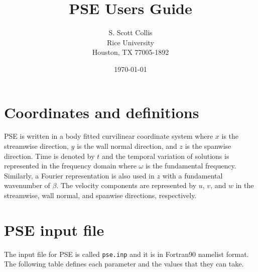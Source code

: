 \documentclass[10pt]{article}
\newcommand{\pse}{\textsf{PSE}\xspace}
\begin{document}
\title{\pse Users Guide}
\author{S. Scott Collis \\
Rice University \\
Houston, TX 77005-1892 }
\date{\today}
\maketitle

\section*{Coordinates and definitions}

\pse is written in a body fitted curvilinear coordinate system where $x$ is
the streamwise direction, $y$ is the wall normal direction, and $z$ is the
spanwise direction.  Time is denoted by $t$ and the temporal variation of
solutions is represented in the frequency domain where $\omega$ is the
fundamental frequency.  Similarly, a Fourier representation is also used in
$z$ with a fundamental wavenumber of $\beta$.  The velocity components are
represented by $u$, $v$, and $w$ in the streamwise, wall normal, and spanwise
directions, respectively.

\section*{\pse input file}

The input file for \pse is called {\tt pse.inp} and it is in Fortran90
namelist format.  The following table defines each parameter and the values
that they can take.
\end{document}
